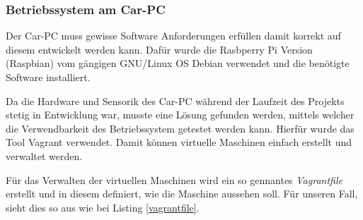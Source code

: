 \subsubsection{Betriebssystem am Car-PC}
\label{subsec:oscarpc}

Der Car-PC muss gewisse Software Anforderungen erfüllen damit korrekt auf diesem entwickelt werden kann. Dafür wurde die Rasbperry Pi Version (Raspbian) vom gängigen GNU/Linux OS Debian verwendet und die benötigte Software installiert.

Da die Hardware und Sensorik des Car-PC während der Laufzeit des Projekts stetig in Entwicklung war, musste eine Lösung gefunden werden, mittels welcher die Verwendbarkeit des Betriebssystem getestet werden kann. Hierfür wurde das Tool Vagrant \cite{MELD.CH3-vagrant.website} verwendet. Damit können virtuelle Maschinen einfach erstellt und verwaltet werden. 

Für das Verwalten der virtuellen Maschinen wird ein so gennantes \textit{Vagrantfile} erstellt und in diesem definiert, wie die Maschine aussehen soll. Für unseren Fall, sieht dies so aus wie bei Listing \ref{vagrantfile}.

